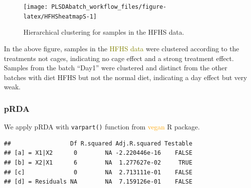 \documentclass[
]{book}
\newenvironment{Shaded}{\begin{snugshade}}{\end{snugshade}}
\newcommand{\AttributeTok}[1]{\textcolor[rgb]{0.77,0.63,0.00}{#1}}
\newcommand{\FunctionTok}[1]{\textcolor[rgb]{0.00,0.00,0.00}{#1}}
\newcommand{\NormalTok}[1]{#1}
\newcommand{\OtherTok}[1]{\textcolor[rgb]{0.56,0.35,0.01}{#1}}
\newcommand{\SpecialCharTok}[1]{\textcolor[rgb]{0.00,0.00,0.00}{#1}}
\begin{document}
\begin{figure}

{\centering \texttt{[image: PLSDAbatch\_workflow\_files/figure-latex/HFHSheatmapS-1]} 

}

\caption{Hierarchical clustering for samples in the HFHS data.}\label{fig:HFHSheatmapS}
\end{figure}

In the above figure, samples in the \textcolor{olive}{HFHS data} were clustered according to the treatments not cages, indicating no cage effect and a strong treatment effect. Samples from the batch ``Day1'' were clustered and distinct from the other batches with diet HFHS but not the normal diet, indicating a day effect but very weak.

\hypertarget{prda-2}{%
\subsubsection{pRDA}\label{prda-2}}

We apply pRDA with \texttt{varpart()} function from \textcolor{orange}{vegan} R package.

\begin{Shaded}
\end{Shaded}

\begin{verbatim}
##                 Df R.squared Adj.R.squared Testable
## [a] = X1|X2      0        NA -2.220446e-16    FALSE
## [b] = X2|X1      6        NA  1.277627e-02     TRUE
## [c]              0        NA  2.713111e-01    FALSE
## [d] = Residuals NA        NA  7.159126e-01    FALSE
\end{verbatim}
\end{document}
